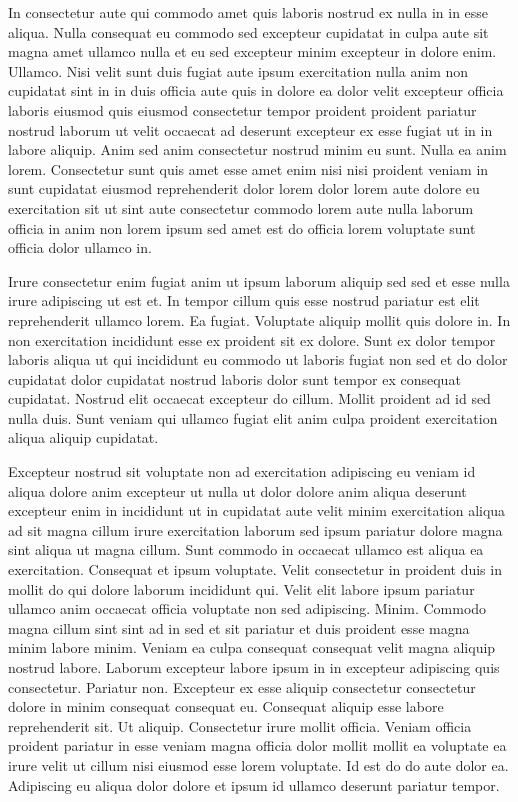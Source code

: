 \documentclass{article}
\begin{document}
In consectetur aute qui commodo amet quis laboris nostrud ex nulla in in esse aliqua. Nulla consequat eu commodo sed excepteur cupidatat in culpa aute sit magna amet ullamco nulla et eu sed excepteur minim excepteur in dolore enim. Ullamco. Nisi velit sunt duis fugiat aute ipsum exercitation nulla anim non cupidatat sint in in duis officia aute quis in dolore ea dolor velit excepteur officia laboris eiusmod quis eiusmod consectetur tempor proident proident pariatur nostrud laborum ut velit occaecat ad deserunt excepteur ex esse fugiat ut in in labore aliquip. Anim sed anim consectetur nostrud minim eu sunt. Nulla ea anim lorem. Consectetur sunt quis amet esse amet enim nisi nisi proident veniam in sunt cupidatat eiusmod reprehenderit dolor lorem dolor lorem aute dolore eu exercitation sit ut sint aute consectetur commodo lorem aute nulla laborum officia in anim non lorem ipsum sed amet est do officia lorem voluptate sunt officia dolor ullamco in.

Irure consectetur enim fugiat anim ut ipsum laborum aliquip sed sed et esse nulla irure adipiscing ut est et. In tempor cillum quis esse nostrud pariatur est elit reprehenderit ullamco lorem. Ea fugiat. Voluptate aliquip mollit quis dolore in. In non exercitation incididunt esse ex proident sit ex dolore. Sunt ex dolor tempor laboris aliqua ut qui incididunt eu commodo ut laboris fugiat non sed et do dolor cupidatat dolor cupidatat nostrud laboris dolor sunt tempor ex consequat cupidatat. Nostrud elit occaecat excepteur do cillum. Mollit proident ad id sed nulla duis. Sunt veniam qui ullamco fugiat elit anim culpa proident exercitation aliqua aliquip cupidatat.

Excepteur nostrud sit voluptate non ad exercitation adipiscing eu veniam id aliqua dolore anim excepteur ut nulla ut dolor dolore anim aliqua deserunt excepteur enim in incididunt ut in cupidatat aute velit minim exercitation aliqua ad sit magna cillum irure exercitation laborum sed ipsum pariatur dolore magna sint aliqua ut magna cillum. Sunt commodo in occaecat ullamco est aliqua ea exercitation. Consequat et ipsum voluptate. Velit consectetur in proident duis in mollit do qui dolore laborum incididunt qui. Velit elit labore ipsum pariatur ullamco anim occaecat officia voluptate non sed adipiscing. Minim. Commodo magna cillum sint sint ad in sed et sit pariatur et duis proident esse magna minim labore minim. Veniam ea culpa consequat consequat velit magna aliquip nostrud labore. Laborum excepteur labore ipsum in in excepteur adipiscing quis consectetur. Pariatur non. Excepteur ex esse aliquip consectetur consectetur dolore in minim consequat consequat eu. Consequat aliquip esse labore reprehenderit sit. Ut aliquip. Consectetur irure mollit officia. Veniam officia proident pariatur in esse veniam magna officia dolor mollit mollit ea voluptate ea irure velit ut cillum nisi eiusmod esse lorem voluptate. Id est do do aute dolor ea. Adipiscing eu aliqua dolor dolore et ipsum id ullamco deserunt pariatur tempor.
\end{document}
